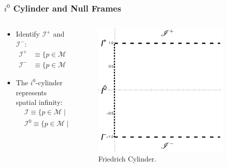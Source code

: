 \documentclass{beamer}
\theoremstyle{remark}
\theoremstyle{plain}
\theoremstyle{plain}
\begin{document}
\begin{frame}
  \frametitle{$i^0$ Cylinder and Null Frames}
  \begin{columns}
    \begin{column}{0.5\textwidth}
      \begin{itemize}
        \item Identify $\mathscr{I}^{+}$ and $\mathscr{I}^{-}$:
        \begin{align*}
          \mathscr{I}^{+} & \equiv \{ p \in \mathcal{M} \; \rvert\; \tau(p) =1\}, \\
          \mathscr{I}^{-} & \equiv \{ p \in \mathcal{M} \; \rvert \;\tau(p) =-1\}.
        \end{align*}
        \vspace{0.4cm}
        \item The $i^0$-cylinder represents spatial infinity:
        \begin{align}
          & \mathcal{I} \equiv \{ p \in \mathcal{M} \; \rvert \;\; |\tau(p)| \leq 1, \;\rho(p)=0\}, \nonumber \\  
          & \mathcal{I}^{0} \equiv \{ p \in \mathcal{M}\; \rvert \;\tau(p)=0, \; \rho(p)=0\}. \nonumber 
        \end{align}
      \end{itemize}
    \end{column}
    \begin{column}{0.5\textwidth}
      \vspace*{-0.5em} %
      \hfill
      \begin{figure}[h]
        \includegraphics[width=0.9\textwidth]{friedrich cylinder.pdf} %
        \caption{Friedrich Cylinder.}
      \end{figure}
    \end{column}
  \end{columns}
\end{frame}
\end{document}
